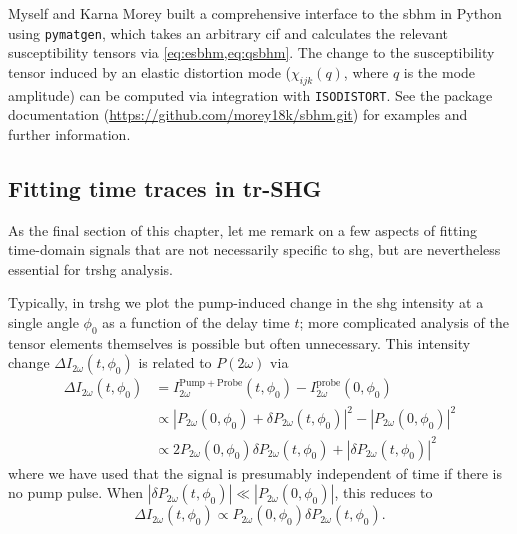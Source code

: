 Myself and Karna Morey built a comprehensive interface to the \gls{sbhm} in Python using \texttt{pymatgen}\citep{ong_python_2013}, which takes an arbitrary \gls{cif} and calculates the relevant susceptibility tensors via \cref{eq:esbhm,eq:qsbhm}.
The change to the susceptibility tensor induced by an elastic distortion mode ($\chi_{ijk}(q)$, where $q$ is the mode amplitude) can be computed via integration with \texttt{ISODISTORT}\citep{isodistort, campbell_isodisplace_2006}.
See the package documentation (\url{https://github.com/morey18k/sbhm.git}) for examples and further information.

\subsection{Fitting time traces in tr-SHG}

As the final section of this chapter, let me remark on a few aspects of fitting time-domain signals that are not necessarily specific to \gls{shg}, but are nevertheless essential for \gls{trshg} analysis.

Typically, in \gls{trshg} we plot the pump-induced change in the \gls{shg} intensity at a single angle $\phi_0$ as a function of the delay time $t$; more complicated analysis of the tensor elements themselves is possible but often unnecessary.
This intensity change $\Delta I_{2\omega}(t, \phi_0)$ is related to $P(2\omega)$ via
\begin{align}
\Delta I_{2\omega}(t, \phi_0) &= I_{2\omega}^{\mathrm{Pump}+\mathrm{Probe}}(t, \phi_0)-I_{2\omega}^\mathrm{probe}(0, \phi_0)\\
&\propto |P_{2\omega}(0, \phi_0)+\delta P_{2\omega}(t, \phi_0)|^2 - |P_{2\omega}(0, \phi_0)|^2\\
&\propto 2P_{2\omega}(0, \phi_0)\delta P_{2\omega}(t, \phi_0) + |\delta P_{2\omega}(t, \phi_0)|^2
\end{align}
where we have used that the signal is presumably independent of time if there is no pump pulse.
When $|\delta P_{2\omega}(t, \phi_0)| \ll |P_{2\omega}(0, \phi_0)|$, this reduces to
\begin{equation}
\Delta I_{2\omega}(t, \phi_0) \propto P_{2\omega}(0, \phi_0)\delta P_{2\omega}(t, \phi_0).
\end{equation}

